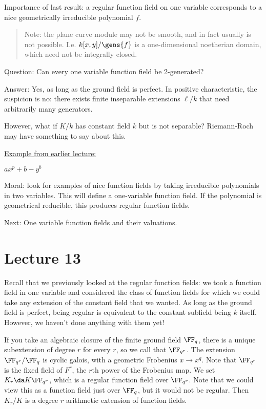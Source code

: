 Importance of last result: a regular function field on one variable
corresponds to a nice geometrically irreducible polynomial \(f\).

\begin{quote}
Note: the plane curve module may not be smooth, and in fact usually is
not possible. I.e. \(k[x ,y]/\gens{f}\) is a one-dimensional noetherian
domain, which need not be integrally closed.
\end{quote}

Question: Can every one variable function field be 2-generated?

Answer: Yes, as long as the ground field is perfect. In positive
characteristic, the suspicion is no: there exists finite inseparable
extensions \(\ell/k\) that need arbitrarily many generators.

However, what if \(K/k\) has constant field \(k\) but is not separable?
Riemann-Roch may have something to say about this.

\begin{example}

\hyperref[technical_example]{Example from earlier lecture:}

\(ax^p + b - y^b\)

\end{example}

Moral: look for examples of nice function fields by taking irreducible
polynomials in two variables. This will define a one-variable function
field. If the polynomial is geometrical reducible, this produces regular
function fields.

Next: One variable function fields and their valuations.

\hypertarget{lecture-13}{%
\section{Lecture 13}\label{lecture-13}}

Recall that we previously looked at the regular function fields: we took
a function field in one variable and considered the class of function
fields for which we could take any extension of the constant field that
we wanted. As long as the ground field is perfect, being regular is
equivalent to the constant subfield being \(k\) itself. However, we
haven't done anything with them yet!

If you take an algebraic closure of the finite ground field \(\FF_q\),
there is a unique subextension of degree \(r\) for every \(r\), so we
call that \(\FF_{q^r}\). The extension \(\FF_{q^r}/\FF_q\) is cyclic
galois, with a geometric Frobenius \(x\to x^q\). Note that \(\FF_{q^r}\)
is the fixed field of \(F^r\), the \(r\)th power of the Frobenius map.
We set \(K_r \da K \FF_{q^r}\), which is a regular function field over
\(\FF_{q^r}\). Note that we could view this as a function field just
over \(\FF_q\), but it would not be regular. Then \(K_r/K\) is a degree
\(r\) arithmetic extension of function fields.

